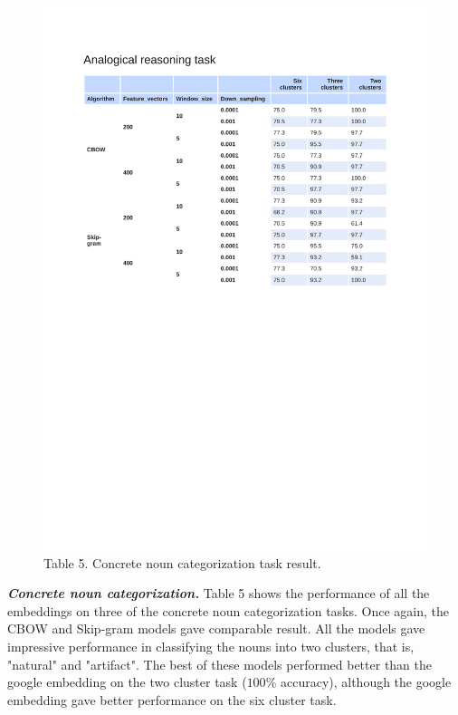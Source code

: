 \documentclass[12pt]{report}
\begin{document}
\begin{figure}
	\centering
	\includegraphics[trim=1cm 13cm 0cm 3.25cm, clip=true,width=\textwidth]{./Figures/summary-categorical.pdf}
	\caption*{Table 5. Concrete noun categorization task result.}
	\label{fig:cata}
	
\end{figure}
\noindent\textbf{\emph{Concrete noun categorization.}} Table 5 shows the performance of all the 
embeddings on three of the concrete noun categorization tasks. Once again, the CBOW and Skip-gram 
models gave comparable result. All the models gave impressive performance in classifying the nouns into two clusters, that is, "natural" and "artifact". The best of these models performed better than the google embedding on the two cluster task ($100\%$ accuracy), although the google embedding gave better performance on the six cluster task.
\end{document}
